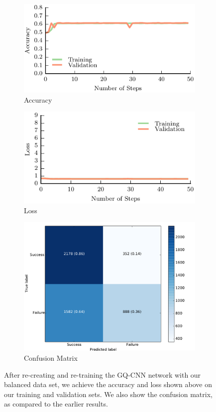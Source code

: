 \begin{figure}[t!]
    \centering
    \begin{subfigure}[t]{0.32\textwidth}
        \includegraphics[width=0.9\columnwidth]{figs/gqcnn_accuracy.pdf}
        \caption{Accuracy} \label{fig:accuracy_gqcnn}
        \end{subfigure}
    \begin{subfigure}[t]{0.32\textwidth}
        \includegraphics[width=0.9\columnwidth]{figs/gqcnn_loss.pdf}
        \caption{Loss} \label{fig:loss_qgcnn}
    \end{subfigure}
		\begin{subfigure}[t]{0.32\textwidth}
        \includegraphics[width=0.8\columnwidth]{figs/trained_gqcnn.pdf}
        \caption{Confusion Matrix} \label{fig:confusion_qgcnn}
    \end{subfigure}
\caption{After re-creating and re-training the GQ-CNN network with our balanced data set, we achieve the accuracy and loss shown above on our training and validation sets. We also show the confusion matrix, as compared to the earlier results.} \label{fig:gqcnn_results}
\end{figure}

